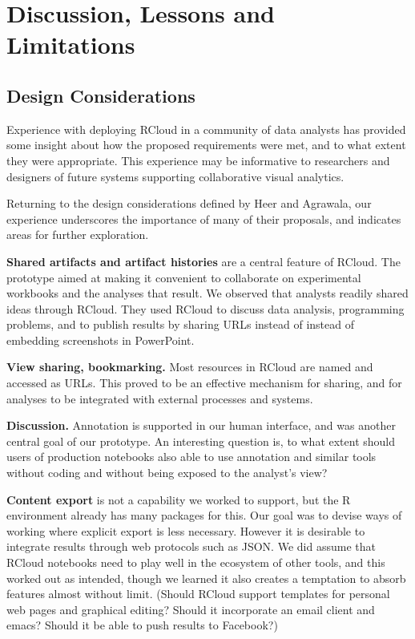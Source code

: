 \section{Discussion, Lessons and Limitations}

\subsection{Design Considerations}

Experience with deploying RCloud in a community of data analysts
has provided some insight about how the proposed requirements
were met, and to what extent they were appropriate.
This experience may be informative to researchers and designers
of future systems supporting collaborative visual analytics.

Returning to the design considerations defined by Heer and Agrawala,
our experience underscores the importance of many of their proposals,
and indicates areas for further exploration.

{\bf Shared artifacts and artifact histories} are a central feature
of RCloud. The prototype aimed at making it convenient to collaborate
on experimental workbooks and the analyses that result. We observed
that analysts readily shared ideas through RCloud. They used RCloud
to discuss data analysis, programming problems, and to publish results
by sharing URLs instead of instead of embedding screenshots in
PowerPoint.

{\bf View sharing, bookmarking.} Most resources in RCloud are named
and accessed as URLs. This proved to be an effective mechanism
for sharing, and for analyses to be integrated with
external processes and systems.

{\bf Discussion.} Annotation is supported in our human interface,
and was another central goal of our prototype. 
An interesting question is, to what extent should users of production
notebooks also able to use annotation and similar tools without coding
and without being exposed to the analyst's view?

{\bf Content export} is not a capability we worked to support,
but the R environment already has many packages for this.
Our goal was to devise ways of working where explicit export
is less necessary. However it is desirable to integrate results
through web protocols such as JSON. We did assume that RCloud
notebooks need to play well in the ecosystem of other tools,
and this worked out as intended, though we learned it also creates
a temptation to absorb features almost without limit. (Should
RCloud support templates for personal web pages and graphical
editing? Should it incorporate an email client and emacs?
Should it be able to push results to Facebook?)

